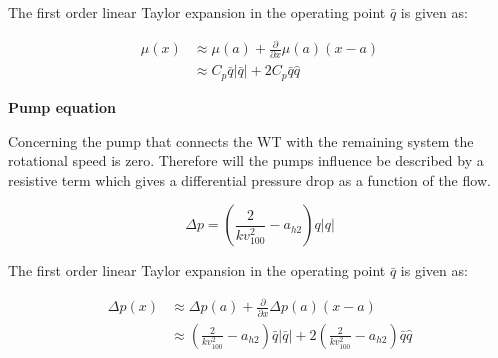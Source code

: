 The first order linear Taylor expansion in the operating point $\bar{q}$ is given as:

\begin{equation}
	\begin{split}
		\mu(x) &\approx \mu(a) + \frac{\partial}{\partial x} \mu(a) (x-a) \\
			   &\approx C_p \bar{q} |\bar{q}| + 2 C_p \bar{q} \hat{q}
	\end{split}
\end{equation}


\bigskip
\bigskip 
\textbf{Pump equation}

Concerning the pump that connects the WT with the remaining system the rotational speed is zero. Therefore will the pumps influence be described by a resistive term which gives a differential pressure drop as a function of the flow.

\begin{equation}
	\Delta p = (\frac{2}{{kv_{100}^2}} - a_{h2}) q |q|
\end{equation}

The first order linear Taylor expansion in the operating point $\bar{q}$ is given as:

\begin{equation}
	\begin{split}
		\Delta p(x) &\approx \Delta p(a) + \frac{\partial}{\partial x} \Delta p(a) (x-a) \\
			   &\approx (\frac{2}{{kv_{100}^2}} - a_{h2}) \bar{q} |\bar{q}| + 2 (\frac{2}{{kv_{100}^2}} - a_{h2}) \bar{q} \hat{q}
	\end{split}
\end{equation}